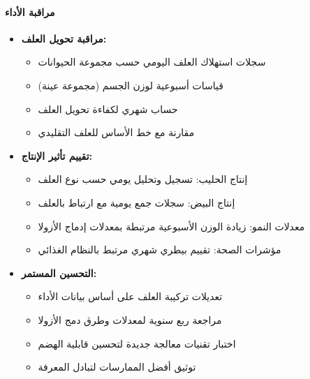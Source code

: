 \paragraph{مراقبة الأداء}
\begin{itemize}
    \item \textbf{مراقبة تحويل العلف:}
    \begin{itemize}
        \item سجلات استهلاك العلف اليومي حسب مجموعة الحيوانات
        \item قياسات أسبوعية لوزن الجسم (مجموعة عينة)
        \item حساب شهري لكفاءة تحويل العلف
        \item مقارنة مع خط الأساس للعلف التقليدي
    \end{itemize}
    \item \textbf{تقييم تأثير الإنتاج:}
    \begin{itemize}
        \item إنتاج الحليب: تسجيل وتحليل يومي حسب نوع العلف
        \item إنتاج البيض: سجلات جمع يومية مع ارتباط بالعلف
        \item معدلات النمو: زيادة الوزن الأسبوعية مرتبطة بمعدلات إدماج الأزولا
        \item مؤشرات الصحة: تقييم بيطري شهري مرتبط بالنظام الغذائي
    \end{itemize}
    \item \textbf{التحسين المستمر:}
    \begin{itemize}
        \item تعديلات تركيبة العلف على أساس بيانات الأداء
        \item مراجعة ربع سنوية لمعدلات وطرق دمج الأزولا
        \item اختبار تقنيات معالجة جديدة لتحسين قابلية الهضم
        \item توثيق أفضل الممارسات لتبادل المعرفة
    \end{itemize}
\end{itemize}


